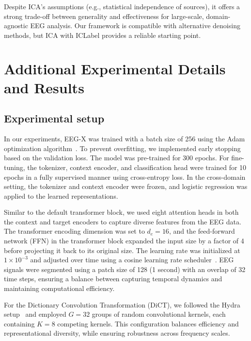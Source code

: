 \documentclass{article} %
\begin{document}
Despite ICA’s assumptions (e.g., statistical independence of sources), it offers a strong trade-off between generality and effectiveness for large-scale, domain-agnostic EEG analysis. Our framework is compatible with alternative denoising methods, but ICA with ICLabel provides a reliable starting point.



\section{Additional Experimental Details and Results} \label{app:exp}

\subsection{Experimental setup} \label{app:setup}
In our experiments, EEG-X was trained with a batch size of 256 using the Adam optimization algorithm~\citep{kingma2014adam}. To prevent overfitting, we implemented early stopping based on the validation loss. The model was pre-trained for 300 epochs. For fine-tuning, the tokenizer, context encoder, and classification head were trained for 10 epochs in a fully supervised manner using cross-entropy loss. In the cross-domain setting, the tokenizer and context encoder were frozen, and logistic regression was applied to the learned representations.

Similar to the default transformer block\citep{attention2017}, we used eight attention heads in both the context and target encoders to capture diverse features from the EEG data. The transformer encoding dimension was set to $d_e = 16$, and the feed-forward network (FFN) in the transformer block expanded the input size by a factor of 4 before projecting it back to its original size. The learning rate was initialized at $1 \times 10^{-3}$ and adjusted over time using a cosine learning rate scheduler~\citep{data2vec2022}. EEG signals were segmented using a patch size of 128 (1 second) with an overlap of 32 time steps, ensuring a balance between capturing temporal dynamics and maintaining computational efficiency.

For the Dictionary Convolution Transformation (DiCT), we followed the Hydra setup~\citep{Hydra,dempster_etal_2024} and employed $G = 32$ groups of random convolutional kernels, each containing $K = 8$ competing kernels. This configuration balances efficiency and representational diversity, while ensuring robustness across frequency scales.
\end{document}
